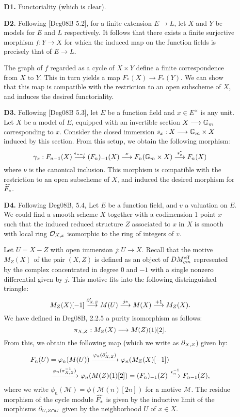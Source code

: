 \begin{enumerate}
\item[\textbf{D1.}] Functoriality (which is clear).

\item[\textbf{D2.}] Following [Deg08B 5.2], for a finite extension
$E \to L$, let $X$ and $Y$ be models for $E$ and $L$ respectively.
It follows that there exists a finite surjective morphism $f: Y 
\to X$ for which the induced map on the function fields is 
precisely that of $E \to L$.

The graph of $f$ regarded as a cycle of $X \times Y$ define a 
finite correspondence from $X$ to $Y$. This in turn yields a map 
$F_*(X) \to F_*(Y)$. We can show that this map is compatible with 
the restriction to an open subscheme of $X$, and induces the 
desired functoriality.

\item[\textbf{D3.}] Following [Deg08B 5.3], let $E$ be a function
field and $x \in E^{\times}$ is any unit. Let $X$ be a model of 
$E$, equipped with an invertible section $X \longrightarrow \mathbb{G}_m$ corresponding
to $x$. Consider the closed immersion $s_x: X \longrightarrow \mathbb{G}_m \times X$
induced by this section. From this setup, we obtain the following 
morphism:
\[
\gamma_x: F_{n - 1}(X) \stackrel{\epsilon_{n - 1}}{\longrightarrow} (F_n)_{-1}(X)
\stackrel{\nu}{\longrightarrow} F_n(\mathbb{G}_m \times X) \stackrel{s_x^*}{\longrightarrow} 
F_n(X)
\]
where $\nu$ is the canonical inclusion. This morphism is 
compatible with the restriction to an open subscheme of $X$, and 
induced the desired morphism for $\widehat{F_*}$.

\item[\textbf{D4.}] Following Deg08B, 5.4, Let $E$ be a function 
field, and $v$ a valuation on $E$. We could find a smooth scheme
$X$ together with a codimension 1 point $x$ such that the induced
reduced structure $Z$ associated to $x$ in $X$ is smooth with 
local ring $\mathcal{O}_{X,x}$ isomorphic to the ring of integers of $v$.

Let $U = X - Z$ with open immersion $j: U \to X$. Recall that the
motive $M_Z(X)$ of the pair $(X, Z)$ is defined as an object of
$DM^{\mathrm{eff}}_{gm}$ represented by the complex concentrated in degree 0
and $-1$ with a single nonzero differential given by $j$. This
motive fits into the following distringuished triangle:
\[
M_Z(X)[-1] \stackrel{\partial_{X, Z}'}{\longrightarrow} M(U) \stackrel{j*}{\longrightarrow}
M(X) \stackrel{+1}{\longrightarrow} M_Z(X).
\]
We have defined in Deg08B, 2.2.5 a purity isomorphism as follows:
\[
\pi_{X, Z}: M_Z(X) \longrightarrow M(Z)(1)[2].
\]
From this, we obtain the following map (which we write as 
$\partial_{X, Z}$) given by:
\begin{align*}
F_n(U) &= \varphi_n(M(U)) \xrightarrow{\varphi_n(\partial_{X,Z}')} 
   \varphi_n(M_Z(X)[-1]) \\
   &\xrightarrow{\varphi_n(\pi_{X, Z}^{-1})} \varphi_n(M(Z)(1)[2])
    = (F_n)_{-1}(Z) \stackrel{\epsilon_n^{-1}}{\longrightarrow} F_{n - 1}(Z),
\end{align*}
where we write $\phi_n(\mathcal{M}) = \phi(\mathcal{M}(n)[2n])$
for a motive $\mathcal{M}$. The residue morphism of the cycle
module $\widehat{F_*}$ is given by the inductive limit of the
morphisms $\partial_{U, Z \cap U}$ given by the neighborhood $U$ of
$x \in X$.
\end{enumerate}


